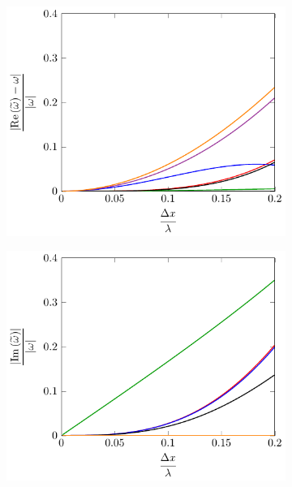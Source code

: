 \begin{figure}
	\centering
	\begin{subfigure}{0.5\textwidth}
		\includegraphics[width=\textwidth]{./chp4/figures/Dispu0khShallRez.pdf}
	\end{subfigure}%
	\begin{subfigure}{0.5\textwidth}
		\includegraphics[width=\textwidth]{./chp4/figures/Dispu0khShallImz.pdf}
	\end{subfigure}
	\begin{subfigure}{0.5\textwidth}

\end{subfigure}
\end{figure}
